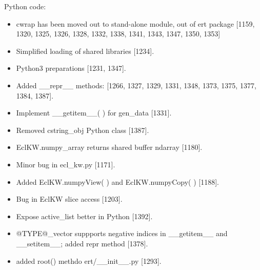 \documentclass[a4paper,10pt,english]{sphinxmanual}
\begin{document}
Python code:
\begin{itemize}
\item {} 
cwrap has been moved out to stand-alone module, out of ert
package {[}1159, 1320, 1325, 1326, 1328, 1332, 1338, 1341, 1343, 1347, 1350, 1353{]}

\item {} 
Simplified loading of shared libraries {[}1234{]}.

\item {} 
Python3 preparations {[}1231, 1347{]}.

\item {} 
Added \_\_repr\_\_ methods: {[}1266, 1327, 1329, 1331, 1348, 1373, 1375, 1377, 1384, 1387{]}.

\item {} 
Implement \_\_getitem\_\_( ) for gen\_data {[}1331{]}.

\item {} 
Removed cstring\_obj Python class {[}1387{]}.

\item {} 
EclKW.numpy\_array returns shared buffer ndarray {[}1180{]}.

\item {} 
Minor bug in ecl\_kw.py {[}1171{]}.

\item {} 
Added EclKW.numpyView( ) and EclKW.numpyCopy( ) {[}1188{]}.

\item {} 
Bug in EclKW slice access {[}1203{]}.

\item {} 
Expose active\_list better in Python {[}1392{]}.

\item {} 
@TYPE@\_vector suppports negative indices in \_\_getitem\_\_ and
\_\_setitem\_\_; added repr method {[}1378{]}.

\item {} 
added root() methdo ert/\_\_init\_\_.py {[}1293{]}.

\end{itemize}
\end{document}
